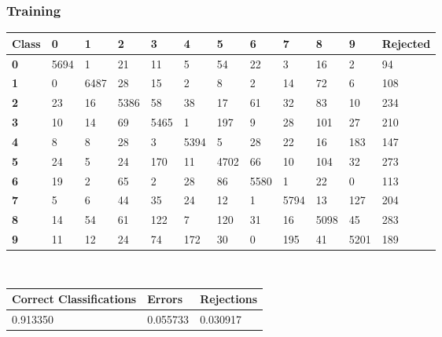 \documentclass[
  a4paper,            %
  DIV=10,             %
  oneside,            %
  BCOR=5mm,           %
  parskip=half,       %
  numbers=noenddot,   %
  bibtotoc,           %
  listof=totoc,        %
  article
]{scrreprt}
\begin{document}
\subsubsection{Training}
\begin{center}
  \begin{tabular}{|p{1cm}|p{1cm}|p{1cm}|p{1cm}|p{1cm}|p{1cm}|p{1cm}|p{1cm}|p{1cm}|p{1cm}|p{1cm}|p{1.7cm}|}
    \hline
    \textbf{Class} & \textbf{0} & \textbf{1} & \textbf{2} & \textbf{3} & \textbf{4} & \textbf{5} & \textbf{6} & \textbf{7} & \textbf{8} & \textbf{9} & \textbf{Rejected} \\
    \hline
    \textbf{0} & 5694 & 1 & 21 & 11 & 5 & 54 & 22 & 3 & 16 & 2 & 94 \\
    \hline
    \textbf{1} & 0 & 6487 & 28 & 15 & 2 & 8 & 2 & 14 & 72 & 6 & 108 \\
    \hline
    \textbf{2} & 23 & 16 & 5386 & 58 & 38 & 17 & 61 & 32 & 83 & 10 & 234 \\
    \hline
    \textbf{3} & 10 & 14 & 69 & 5465 & 1 & 197 & 9 & 28 & 101 & 27 & 210 \\
    \hline
    \textbf{4} & 8 & 8 & 28 & 3 & 5394 & 5 & 28 & 22 & 16 & 183 & 147 \\
    \hline
    \textbf{5} & 24 & 5 & 24 & 170 & 11 & 4702 & 66 & 10 & 104 & 32 & 273 \\
    \hline
    \textbf{6} & 19 & 2 & 65 & 2 & 28 & 86 & 5580 & 1 & 22 & 0 & 113 \\
    \hline
    \textbf{7} & 5 & 6 & 44 & 35 & 24 & 12 & 1 & 5794 & 13 & 127 & 204 \\
    \hline
    \textbf{8} & 14 & 54 & 61 & 122 & 7 & 120 & 31 & 16 & 5098 & 45 & 283 \\
    \hline
    \textbf{9} & 11 & 12 & 24 & 74 & 172 & 30 & 0 & 195 & 41 & 5201 & 189 \\
    \hline
  \end{tabular}
\end{center}
\
\begin{center}
  \begin{tabular}{|p{5cm}|p{3cm}|p{3cm}|}
    \hline
    \textbf{Correct Classifications} & \textbf{Errors} & \textbf{Rejections} \\
    \hline
    0.913350 & 0.055733 & 0.030917 \\
    \hline
  \end{tabular}
\end{center}
\end{document}
